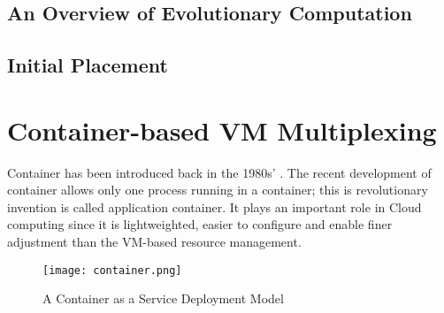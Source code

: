 

\subsection*{An Overview of Evolutionary Computation}


\subsection*{Initial Placement}

\section*{Container-based VM Multiplexing}
Container has been introduced back in the 1980s' \cite{}. The recent development of container
allows only one process running in a container; this is revolutionary invention is called application
container. It plays an important role in Cloud computing since it is lightweighted, easier to configure
and enable finer adjustment than the VM-based resource management.


\begin{figure}
	\centering
	\texttt{[image: container.png]}
	\caption{A Container as a Service Deployment Model}
	\label{fig:container}
\end{figure}


